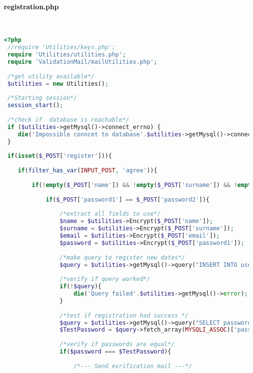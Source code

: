  
 \paragraph{\textcolor{black}{registration.php}}\leavevmode\\
 \raggedright
 \begin{lstlisting}[language=php]
 <?php
 //require 'Utilities/keys.php';
 require 'Utilities/utilities.php';
 require 'ValidationMail/mailUtilities.php';
 
 /*get utility available*/
 $utilities = new Utilities();
 
 /*Starting session*/
 session_start();
 
 /*check if  database is reachable*/
 if ($utilities->getMysql()->connect_errno) {
 	die('Impossible conncet to database'.$utilities->getMysql()->connect_error);
 }
 
 if(isset($_POST['register'])){
 	
 	if(filter_has_var(INPUT_POST, 'agree')){
 		
 		if(!empty($_POST['name']) && !empty($_POST['surname']) && !empty($_POST['email']) && !empty($_POST['password1']) && !empty($_POST['password2'])){
 			
 			if($_POST['password1'] == $_POST['password2']){
 				
 				/*extract all fields to use*/
 				$name = $utilities->Encrypt($_POST['name']);
 				$surname = $utilities->Encrypt($_POST['surname']);
 				$email = $utilities->Encrypt($_POST['email']);
 				$password = $utilities->Encrypt($_POST['password1']);
 				
 				/*make query to register new dates*/
 				$query = $utilities->getMysql()->query("INSERT INTO user_table1 (name, surname, email, password) VALUES ('{$name}', '{$surname}', '{$email}', '{$password}')");
 				
 				/*verify if query worked*/
 				if(!$query){
 					die('Query failed'.$utilities->getMysql()->error);
 				}
 				
 				/*test if registration had success */
 				$query = $utilities->getMysql()->query("SELECT password FROM user_table1 WHERE (email = '{$email}')");
 				$TestPassword = $query->fetch_array(MYSQLI_ASSOC)['password'];
 				
 				/*verify if passwords are equal*/
 				if($password === $TestPassword){
 					
 					/*--- Send evrification mail ---*/
 					

\end{lstlisting}
